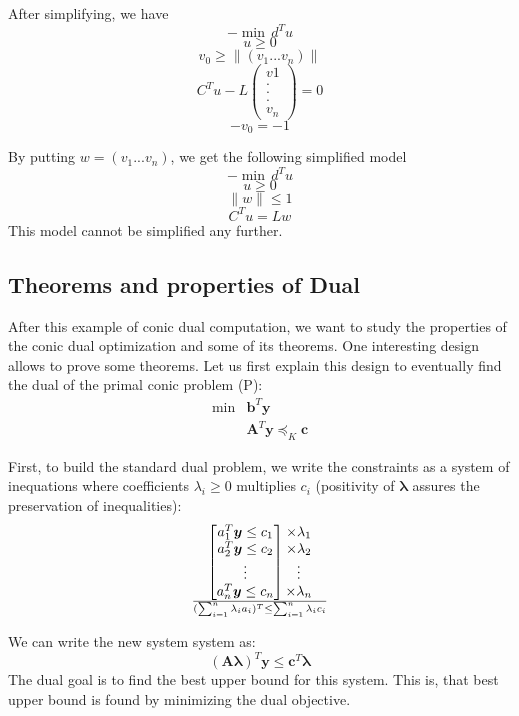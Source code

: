  After simplifying, we have \\
 $$-\min \, d^Tu$$
 $$u \geq 0$$
 $$v_0 \geq \parallel (v_1 ... v_n) \parallel$$
 $$C^Tu - L\begin{pmatrix}
 v1\\ 
 .\\
 .\\
 .\\
 v_n
 \end{pmatrix} = 0 $$
 $$-v_0=-1$$
 
 By putting $w=(v_1 ... v_n)$, we get the following simplified model 
$$-\min \, d^Tu$$
$$u \geq 0$$
$$\parallel w \parallel \leq 1$$
$$C^Tu = Lw$$
This model cannot be simplified any further.


\subsection{Theorems and properties of Dual}
After this example of conic dual computation, we want to study the properties of the conic dual optimization and some of its theorems. One interesting design allows to prove some theorems. Let us first explain this design to eventually find the dual of the primal conic problem (P):
\begin{align*}
\min&\textbf{b}^T\textbf{y}\\
             &\textbf{A}^T\textbf{y}\preceq_K \textbf{c}
\end{align*}

First, to build the standard dual problem, we write the constraints as a system of inequations where coefficients $\lambda_i \geq 0$ multiplies $c_i$ (positivity of $\boldsymbol{\lambda}$ assures the preservation of inequalities):
\[\begin{bmatrix}
 a_1^T \boldsymbol{y} \leq c_1\\
 a_2^T \boldsymbol{y} \leq c_2\\
 \vdots\\
 a_n^T \boldsymbol{y} \leq c_n
\end{bmatrix}
\begin{matrix}
 \times \lambda_1\\
 \times \lambda_2\\
 \vdots\\
 \times \lambda_n
\end{matrix}
\over
(\sum_{i=1}^{n}\lambda_i a_i)^T \leq \sum_{i=1}^{n}\lambda_i c_i\]

We can write the new system system as:
\[(\boldsymbol{A}\boldsymbol{\lambda})^T \boldsymbol{y} \leq \boldsymbol{c}^T \boldsymbol{\lambda}
\]
The dual goal is to find the best upper bound for this system. This is, that best upper bound is found by minimizing the dual objective.\\

